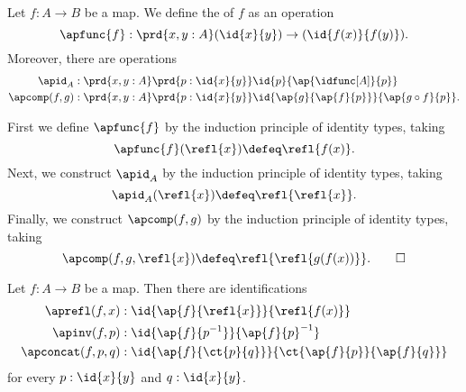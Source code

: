 \begin{defn}\label{defn:ap}
Let $f:A\to B$ be a map. We define the  of $f$ as an operation
\begin{equation*}
\apfunc{f} : \prd{x,y:A} (\id{x}{y})\to(\id{f(x)}{f(y)}).
\end{equation*}
Moreover, there are operations
\begin{align*}
\apid_A & : \prd{x,y:A}\prd{p:\id{x}{y}} \id{p}{\ap{\idfunc[A]}{p}} \\
\apcomp(f,g) & : \prd{x,y:A}\prd{p:\id{x}{y}} \id{\ap{g}{\ap{f}{p}}}{\ap{g\circ f}{p}}.
\end{align*}
\end{defn}

\begin{constr}
First we define $\apfunc{f}$ by the induction principle of identity types, taking
\begin{equation*}
\apfunc{f}(\refl{x})\defeq \refl{f(x)}.
\end{equation*}
Next, we construct $\apid_A$ by the induction principle of identity types, taking
\begin{equation*}
\apid_A(\refl{x}) \defeq \refl{\refl{x}}.
\end{equation*}
Finally, we construct $\apcomp(f,g)$ by the induction principle of identity types, taking
\begin{equation*}
\apcomp(f,g,\refl{x}) \defeq \refl{\refl{g(f(x))}}.\qedhere
\end{equation*}
\end{constr}

\begin{defn}\label{defn:ap-preserve}
Let $f:A\to B$ be a map. Then there are identifications
\begin{align*}
\aprefl(f,x) & : \id{\ap{f}{\refl{x}}}{\refl{f(x)}} \\
\apinv(f,p) & : \id{\ap{f}{p^{-1}}}{\ap{f}{p}^{-1}} \\
\apconcat(f,p,q) & : \id{\ap{f}{\ct{p}{q}}}{\ct{\ap{f}{p}}{\ap{f}{q}}}
\end{align*}
for every $p:\id{x}{y}$ and $q:\id{x}{y}$.
\end{defn}

